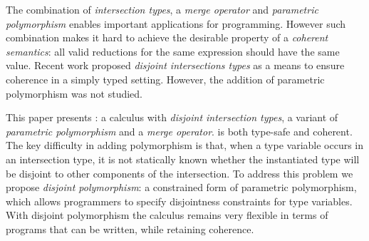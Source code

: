 The combination of \emph{intersection types}, a \emph{merge operator} 
and \emph{parametric polymorphism} enables
important applications for programming. However such combination makes
it hard to achieve the desirable property of a \emph{coherent
semantics}: all valid reductions for the same expression should
have the same value. Recent work proposed \emph{disjoint
intersections types} as a means to ensure coherence in a simply typed
setting. However, the addition of parametric polymorphism was not
studied.

This paper presents \name: a calculus with 
\emph{disjoint intersection types}, a variant of \emph{parametric polymorphism} and a
\emph{merge operator}. \name is both type-safe and
coherent. The key difficulty in adding polymorphism is that, when a type variable occurs in an intersection
type, it is not statically known whether the instantiated type will be
disjoint to other components of the intersection. To address this
problem we propose \emph{disjoint polymorphism}: a constrained form of
parametric polymorphism, which allows programmers to specify
disjointness constraints for type variables. With disjoint
polymorphism the calculus remains very flexible in terms of programs
that can be written, while retaining coherence.

\begin{comment}
Coherence is achieved by ensuring that intersection types
are \emph{disjoint}. The approach works in the presence of parametric
polymorphism. However, parametric polymorphism makes the problem of coherence
significantly harder. When a type variable occurs in an intersection
type, it is not statically known whether the instantiated type will
be disjoint to other components of the intersection.
To address this problem we propose \emph{disjoint polymorphism}: a
constrained form of parametric polymorphism, that allows programmers
to specify disjointness constraints for type variables. With disjoint
polymorphism the calculus remains very flexible in terms of programs
that can be written with intersection types, while retaining coherence.
\end{comment}